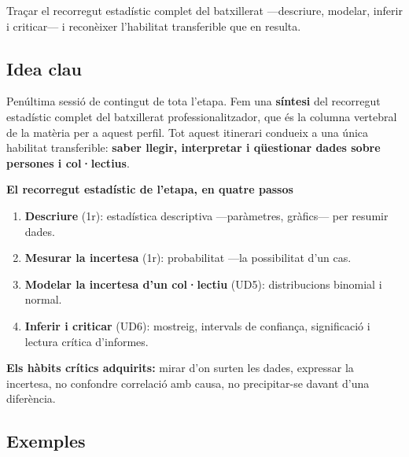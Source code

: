 %
{Traçar el recorregut estadístic complet del batxillerat —descriure, modelar, inferir i criticar— i reconèixer l'habilitat transferible que en resulta.}

\subsection{Idea clau}

Penúltima sessió de contingut de tota l'etapa. Fem una \textbf{síntesi} del recorregut
estadístic complet del batxillerat professionalitzador, que és la columna vertebral de la
matèria per a aquest perfil. Tot aquest itinerari condueix a una única habilitat
transferible: \textbf{saber llegir, interpretar i qüestionar dades sobre persones i
col·lectius}.

\begin{idea}
\textbf{El recorregut estadístic de l'etapa, en quatre passos}
\begin{enumerate}[leftmargin=1.6em, itemsep=2pt]
  \item \textbf{Descriure} (1r): estadística descriptiva —paràmetres, gràfics— per resumir
        dades.
  \item \textbf{Mesurar la incertesa} (1r): probabilitat —la possibilitat d'un cas.
  \item \textbf{Modelar la incertesa d'un col·lectiu} (UD5): distribucions binomial i
        normal.
  \item \textbf{Inferir i criticar} (UD6): mostreig, intervals de confiança, significació i
        lectura crítica d'informes.
\end{enumerate}
\textbf{Els hàbits crítics adquirits:} mirar d'on surten les dades, expressar la incertesa,
no confondre correlació amb causa, no precipitar-se davant d'una diferència.
\end{idea}

\subsection{Exemples}

